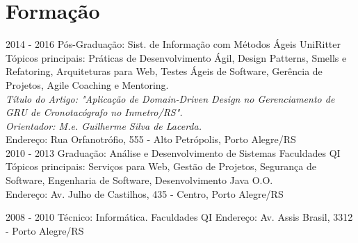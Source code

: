 \documentclass[]{friggeri-cv}
\begin{document}
\section{Formação}
\begin{entrylist}
  \entry
    {2014 - 2016}
    {Pós-Graduação: Sist. de Informação com Métodos Ágeis}
    {UniRitter}
    {Tópicos principais: Práticas de Desenvolvimento Ágil, Design Patterns, Smells e Refatoring, Arquiteturas para Web, Testes Ágeis de Software, Gerência de Projetos, Agile Coaching e Mentoring.\\
    \emph{Título do Artigo: "Aplicação de Domain-Driven Design no Gerenciamento de
GRU de Cronotacógrafo no Inmetro/RS".}\\
    \emph{Orientador: M.e. Guilherme Silva de Lacerda.}\\
    Endereço: Rua Orfanotrófio, 555 - Alto Petrópolis, Porto Alegre/RS\\}
  \entry
    {2010 - 2013}
    {Graduação: Análise e Desenvolvimento de Sistemas}
    {Faculdades QI}
    {Tópicos principais: Serviços para Web, Gestão de Projetos, Segurança de Software, Engenharia de Software, Desenvolvimento Java O.O.\\
    Endereço: Av. Julho de Castilhos, 435 - Centro, Porto Alegre/RS\\}
    
  \entry
    {2008 - 2010}
    {Técnico: Informática.}
    {Faculdades QI}
    {Endereço: Av. Assis Brasil, 3312 - Porto Alegre/RS}
\end{entrylist}
\end{document}
